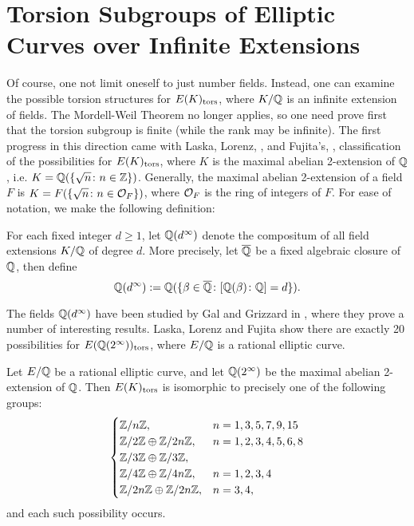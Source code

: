\section{Torsion Subgroups of Elliptic Curves over Infinite Extensions}

Of course, one not limit oneself to just number fields. Instead, one can examine the possible torsion structures for $E(K)_{\text{tors}}$, where $K/\mathbb{Q}$ is an infinite extension of fields. The Mordell-Weil Theorem no longer applies, so one need prove first that the torsion subgroup is finite (while the rank may be infinite). The first progress in this direction came with Laska, Lorenz, \cite{laskalorenz85}, and Fujita's, \cite{fujita04,fujita05}, classification of the possibilities for $E(K)_{\text{tors}}$, where $K$ is the maximal abelian 2-extension of $\mathbb{Q}$, i.e. $K= \mathbb{Q}(\{ \sqrt{n} \colon n \in \mathbb{Z} \})$. Generally, the maximal abelian 2-extension of a field $F$ is $K= F(\{ \sqrt{n} \colon n \in \mathcal{O}_F \})$, where $\mathcal{O}_F$ is the ring of integers of $F$. For ease of notation, we make the following definition:


\begin{dfn}
For each fixed integer $d \geq 1$, let $\mathbb{Q}(d^\infty)$ denote the compositum of all field extensions $K/\mathbb{Q}$ of degree $d$. More precisely, let $\overline{\mathbb{Q}}$ be a fixed algebraic closure of $\mathbb{Q}$, then define
	\[
	\mathbb{Q}(d^\infty):= \mathbb{Q}(\{ \beta \in \overline{\mathbb{Q}} \colon [\mathbb{Q}(\beta) \colon \mathbb{Q}]= d \}).
	\]
\end{dfn}


The fields $\mathbb{Q}(d^\infty)$ have been studied by Gal and Grizzard in \cite{galgrizzard14}, where they prove a number of interesting results. Laska, Lorenz and Fujita show there are exactly 20 possibilities for $E(\mathbb{Q}(2^\infty))_{\text{tors}}$, where $E/\mathbb{Q}$ is a rational elliptic curve. 


\begin{thm}
Let $E/\mathbb{Q}$ be a rational elliptic curve, and let $\mathbb{Q}(2^\infty)$ be the maximal abelian 2-extension of $\mathbb{Q}$. Then $E(K)_{\text{tors}}$ is isomorphic to precisely one of the following groups:
	\[
	\begin{cases}
	\mathbb{Z}/n\mathbb{Z}, & n= 1, 3, 5, 7, 9, 15 \\
	\mathbb{Z}/2\mathbb{Z} \oplus \mathbb{Z}/2n\mathbb{Z}, & n= 1, 2, 3, 4, 5, 6, 8 \\
	\mathbb{Z}/3\mathbb{Z} \oplus \mathbb{Z}/3\mathbb{Z}, \\
	\mathbb{Z}/4\mathbb{Z} \oplus \mathbb{Z}/4n\mathbb{Z}, & n= 1, 2, 3, 4 \\
	\mathbb{Z}/2n\mathbb{Z} \oplus \mathbb{Z}/2n\mathbb{Z}, & n= 3, 4,
	\end{cases}
	\]
and each such possibility occurs. 
\end{thm}


